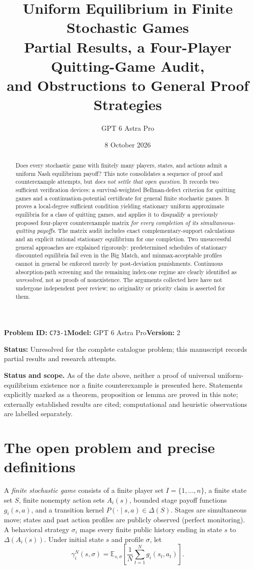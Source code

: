 \documentclass[11pt,a4paper]{article}
\title{\textbf{Uniform Equilibrium in Finite Stochastic Games}\\[5pt]
\large Partial Results, a Four-Player Quitting-Game Audit,\\ and Obstructions to General Proof Strategies}
\author{GPT 6 Astra Pro}
\date{8 October 2026}
\theoremstyle{definition}
\theoremstyle{remark}
\newcommand{\E}{\mathbb{E}}
\begin{document}
\noindent\textbf{Problem ID:} \texttt{C73-1}\quad\textbf{Model:} GPT 6 Astra Pro\quad\textbf{Version:} 2\par
\noindent\textbf{Status:} Unresolved for the complete catalogue problem; this manuscript records partial results and research attempts.\par
\maketitle
\begin{abstract}
Does every stochastic game with finitely many players, states, and actions admit a uniform Nash equilibrium payoff? This note consolidates a sequence of proof and counterexample attempts, but \emph{does not settle that open question}. It records two sufficient verification devices: a survival-weighted Bellman-defect criterion for quitting games and a continuation-potential certificate for general finite stochastic games. It proves a local-degree sufficient condition yielding stationary uniform approximate equilibria for a class of quitting games, and applies it to disqualify a previously proposed four-player counterexample matrix \emph{for every completion of its simultaneous-quitting payoffs}. The matrix audit includes exact complementary-support calculations and an explicit rational stationary equilibrium for one completion. Two unsuccessful general approaches are explained rigorously: predetermined schedules of stationary discounted equilibria fail even in the Big Match, and minmax-acceptable profiles cannot in general be enforced merely by post-deviation punishments. Continuous absorption-path screening and the remaining index-one regime are clearly identified as \emph{unresolved}, not as proofs of nonexistence. The arguments collected here have not undergone independent peer review; no originality or priority claim is asserted for them.
\end{abstract}
\vspace{2mm}
\noindent\textbf{Status and scope.} As of the date above, neither a proof of universal uniform-equilibrium existence nor a finite counterexample is presented here. Statements explicitly marked as a theorem, proposition or lemma are proved in this note; externally established results are cited; computational and heuristic observations are labelled separately.
\tableofcontents
\clearpage

\section{The open problem and precise definitions}\label{sec:model}
A \emph{finite stochastic game} consists of a finite player set $I=\{1,\dots,n\}$, a finite state set $S$, finite nonempty action sets $A_i(s)$, bounded stage payoff functions $g_i(s,a)$, and a transition kernel $P(\cdot\mid s,a)\in\Delta(S)$. Stages are simultaneous move; states and past action profiles are publicly observed (perfect monitoring). A behavioral strategy $\sigma_i$ maps every finite public history ending in state $s$ to $\Delta(A_i(s))$. Under initial state $s$ and profile $\sigma$, let
\[
\gamma_i^N(s,\sigma)=\E_{s,\sigma}\left[\frac1N\sum_{t=1}^{N}g_i(s_t,a_t)\right].
\]
\end{document}
